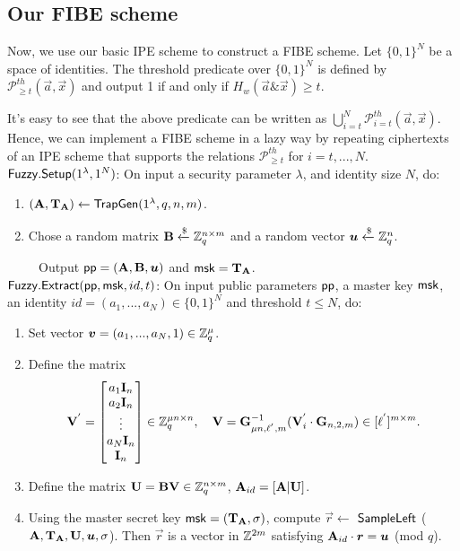 \subsection{Our FIBE scheme}
Now, we use our basic IPE scheme to construct a FIBE scheme. Let $\{0,1\}^{N}$ be a space of identities. The threshold predicate over $\{0,1\}^{N}$ is defined by $\mathcal{P}^{th}_{\geq t}(\vec{a}, \vec{x})$ and output 1 if and only if $H_{w}(\vec{a} \& \vec{x}) \geq t$.\

It's easy to see that the above predicate can be written as $\bigcup^{N}_{i=t}\mathcal{P}^{th}_{i=t}(\vec{a}, \vec{x})$. Hence, we can implement a FIBE scheme in a lazy way by repeating ciphertexts of an IPE scheme that supports the relations $\mathcal{P}^{th}_{\geq t}$ for $i=t,...,N$.\\[0.4cm]
$\mathsf{Fuzzy}.\mathsf{Setup}(1^{\lambda}, 1^{N})$: On input a security parameter $\lambda$, and identity size $N$, do:
\begin{enumerate}
\item $(\textbf{A}, \mathbf{T}_{\mathbf{A}})\leftarrow \mathsf{TrapGen}(1^{\lambda}, q, n, m)$.
\item Chose a random matrix $\mathbf{B}\xleftarrow{\$} \mathbb{Z}^{n \times m}_{q}$ and a random vector $\boldsymbol{u}\xleftarrow{\$} \mathbb{Z}^{n}_{q}$.
\end{enumerate}
~~~~~Output $\mathsf{pp}=(\textbf{A}, \textbf{B}, \boldsymbol{u})$ and $\mathsf{msk}= \mathbf{T}_{\mathbf{A}}$.\\[0.4cm]
$\mathsf{Fuzzy}.\mathsf{Extract}(\mathsf{pp}, \mathsf{msk}, id, t)$: On input public parameters $\mathsf{pp}$, a master key $\mathsf{msk}$, an identity $id= (a_{1},...,a_{N}) \in \{0,1\}^{N}$ and threshold $t \leq N$, do:
\begin{enumerate}
\item Set vector $\boldsymbol{v}=(a_{1},...,a_{N},1) \in \mathbb{Z}^{\mu}_{q}$.
\item Define the matrix
\begin{equation}
 \mathbf{V}^{'}= \begin{bmatrix}
a_{1} \mathbf{I}_{n}\\
a_{2} \mathbf{I}_{n}\\
\vdots\\
a_{N} \mathbf{I}_{n}\\
\mathbf{I}_{n}
\end{bmatrix} \in \mathbb{Z}^{\mu n \times n}_{q},~~~ \mathbf{V}=\mathbf{G}^{-1}_{\mu n,\ell^{'},m}(\mathbf{V}^{'}_{i}\cdot \mathbf{G}_{n,2,m}) \in [\ell^{'}]^{m \times m}.
\end{equation}
\item Define the  matrix $\mathbf{U}=\mathbf{BV} \in \mathbb{Z}^{n \times m}_{q}$, $\mathbf{A}_{id}=[\mathbf{A}|\mathbf{U}]$.
\item Using the master secret key $\mathsf{msk}=(\mathbf{T}_{\mathbf{A}},\sigma)$, compute $\vec{r}\leftarrow$ $\mathsf{SampleLeft}$ ($\mathbf{A}, \mathbf{T}_{\mathbf{A}},\mathbf{U}, \boldsymbol{u},\sigma$). Then $\vec{r}$ is a vector in $\mathbb{Z}^{2m}$ satisfying $\mathbf{A}_{id}\cdot \boldsymbol{r}=\boldsymbol{u}$ (mod $q$).
\end{enumerate}
